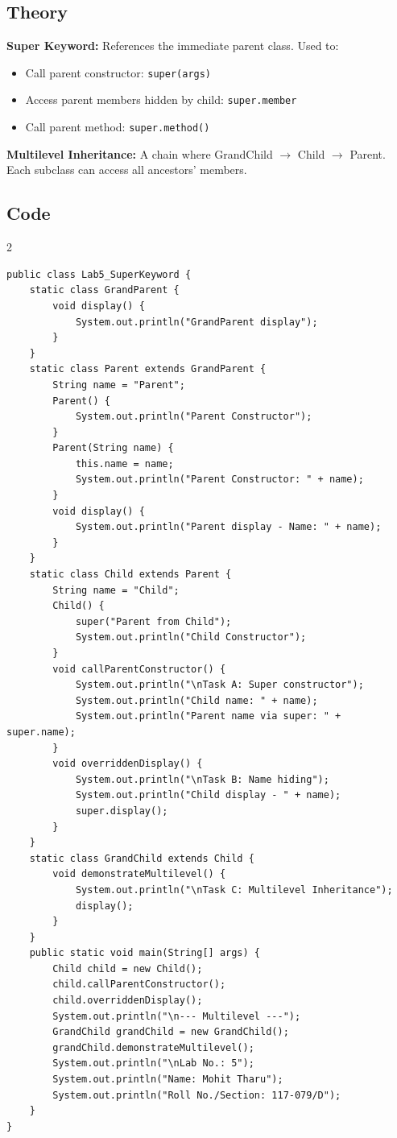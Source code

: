 \documentclass[10pt,a4paper]{article}
\begin{document}
\subsection*{Theory}
\textbf{Super Keyword:} References the immediate parent class. Used to:
\begin{itemize}[nosep]
    \item Call parent constructor: \texttt{super(args)}
    \item Access parent members hidden by child: \texttt{super.member}
    \item Call parent method: \texttt{super.method()}
\end{itemize}
\textbf{Multilevel Inheritance:} A chain where GrandChild $\rightarrow$ Child $\rightarrow$ Parent. Each subclass can access all ancestors' members.

\subsection*{Code}
\begin{multicols}{2}
\begin{lstlisting}
public class Lab5_SuperKeyword {
    static class GrandParent {
        void display() {
            System.out.println("GrandParent display");
        }
    }
    static class Parent extends GrandParent {
        String name = "Parent";
        Parent() {
            System.out.println("Parent Constructor");
        }
        Parent(String name) {
            this.name = name;
            System.out.println("Parent Constructor: " + name);
        }
        void display() {
            System.out.println("Parent display - Name: " + name);
        }
    }
    static class Child extends Parent {
        String name = "Child";
        Child() {
            super("Parent from Child");
            System.out.println("Child Constructor");
        }
        void callParentConstructor() {
            System.out.println("\nTask A: Super constructor");
            System.out.println("Child name: " + name);
            System.out.println("Parent name via super: " + super.name);
        }
        void overriddenDisplay() {
            System.out.println("\nTask B: Name hiding");
            System.out.println("Child display - " + name);
            super.display();
        }
    }
    static class GrandChild extends Child {
        void demonstrateMultilevel() {
            System.out.println("\nTask C: Multilevel Inheritance");
            display();
        }
    }
    public static void main(String[] args) {
        Child child = new Child();
        child.callParentConstructor();
        child.overriddenDisplay();
        System.out.println("\n--- Multilevel ---");
        GrandChild grandChild = new GrandChild();
        grandChild.demonstrateMultilevel();
        System.out.println("\nLab No.: 5");
        System.out.println("Name: Mohit Tharu");
        System.out.println("Roll No./Section: 117-079/D");
    }
}
\end{lstlisting}
\end{multicols}
\end{document}
